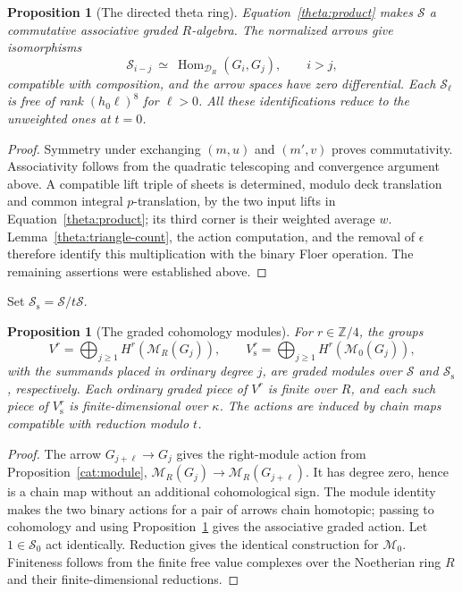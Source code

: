 \documentclass[11pt]{article}
\newtheorem{proposition}[theorem]{Proposition}
\theoremstyle{definition}
\theoremstyle{remark}
\numberwithin{equation}{section}
\begin{document}
\begin{proposition}[The directed theta ring]\label{theta:directed-ring}
Equation~\eqref{theta:product} makes $\mathscr S$ a commutative associative
graded $R$-algebra.  The normalized arrows give isomorphisms
\[
 \mathscr S_{i-j}\ \simeq\
       \operatorname{Hom}_{\mathcal D_R}(G_i,G_j),\qquad i>j,
\]
compatible with composition, and the arrow spaces have zero differential.
Each $\mathscr S_\ell$ is free of rank $(h_0\ell)^8$ for $\ell>0$.
All these identifications reduce to the unweighted ones at $t=0$.
\end{proposition}

\begin{proof}
Symmetry under exchanging $(m,u)$ and $(m',v)$ proves commutativity.
Associativity follows from the quadratic telescoping and convergence
argument above.  A compatible lift triple of sheets is determined, modulo
deck translation and common integral $p$-translation, by the two input
lifts in Equation~\eqref{theta:product}; its third corner is their weighted
average $w$.  Lemma~\ref{theta:triangle-count}, the action computation, and
the removal of $\epsilon$ therefore identify this multiplication with the
binary Floer operation.  The remaining assertions were established above.
\end{proof}

Set $\mathscr S_{\mathrm s}=\mathscr S/t\mathscr S$.
\begin{proposition}[The graded cohomology modules]\label{theta:modules}
For $r\in\mathbb Z/4$, the groups
\begin{equation}\label{theta:module-definition}
 V^r=\bigoplus_{j\geq1}H^r(\mathcal M_R(G_j)),\qquad
 V_{\mathrm s}^r=\bigoplus_{j\geq1}H^r(\mathcal M_0(G_j)),
\end{equation}
with the summands placed in ordinary degree $j$, are graded modules over
$\mathscr S$ and $\mathscr S_{\mathrm s}$, respectively.  Each ordinary
graded piece of $V^r$ is finite over $R$, and each such piece of
$V_{\mathrm s}^r$ is finite-dimensional over $\kappa$.  The actions are
induced by chain maps compatible with reduction modulo $t$.
\end{proposition}

\begin{proof}
The arrow $G_{j+\ell}\to G_j$ gives the right-module action from
Proposition~\ref{cat:module},
$\mathcal M_R(G_j)\to\mathcal M_R(G_{j+\ell})$.  It has degree zero, hence
is a chain map without an additional cohomological sign.  The module
identity makes the two binary actions for a pair of arrows chain
homotopic; passing to cohomology and using
Proposition~\ref{theta:directed-ring} gives the associative graded action.
Let $1\in\mathscr S_0$ act identically.  Reduction gives the identical
construction for $\mathcal M_0$.  Finiteness follows from the finite free
value complexes over the Noetherian ring $R$ and their finite-dimensional
reductions.
\end{proof}
\end{document}
